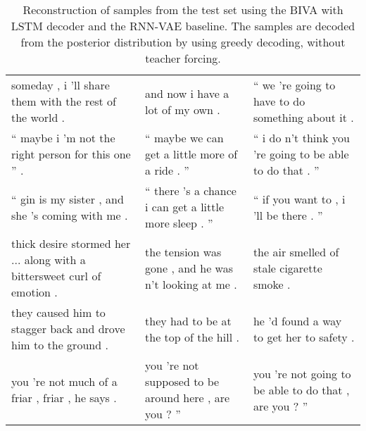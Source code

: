 \documentclass{article}
\def\nm{BIVA\xspace}
\begin{document}
\begin{landscape}
\begin{table}[!h]
\begin{center}
{\begin{small}
\begin{tabular}{lll}
                  someday , i 'll share them with the rest of the world .                            &                                     and now i have a lot of my own .                               &                 `` we 're going to have to do something about it .                             \\
                     `` maybe i 'm not the right person for this one '' .                            &                        `` maybe we can get a little more of a ride . ''                            &             `` i do n't think you 're going to be able to do that . ''                         \\
                        `` gin is my sister , and she 's coming with me .                            &                  `` there 's a chance i can get a little more sleep . ''                           &                            `` if you want to , i 'll be there . ''                             \\
  thick desire stormed her ... along with a bittersweet curl of emotion .                            &                   the tension was gone , and he was n't looking at me .                            &                     the air smelled of stale cigarette smoke .                                 \\
            they caused him to stagger back and drove him to the ground .                            &                               they had to be at the top of the hill .                              &                          he 'd found a way to get her to safety .                              \\
                          you 're not much of a friar , friar , he says .                            &                   you 're not supposed to be around here , are you ? ''                            &                you 're not going to be able to do that , are you ? ''                          \\
\bottomrule
\end{tabular}

\end{small}
}
\end{center}
\caption{Reconstruction of samples from the test set using the \nm with LSTM decoder and the RNN-VAE baseline. The samples are decoded from the posterior distribution by using greedy decoding, without teacher forcing.}
\label{table:text-reconstructions}
\end{table}
\end{landscape}
\end{document}
